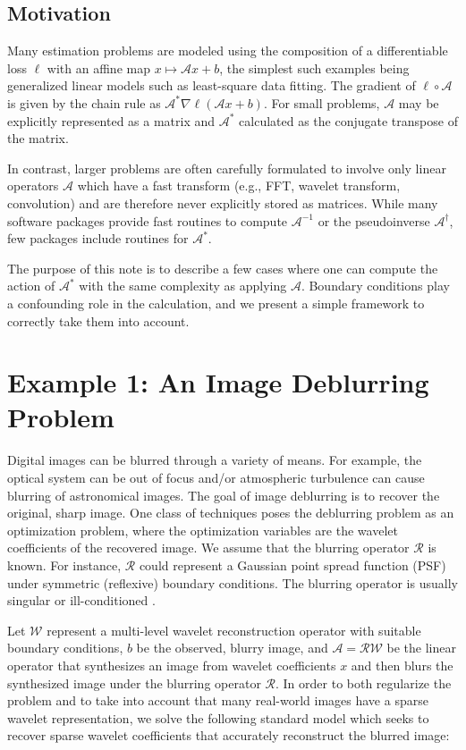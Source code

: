 \documentclass[journal]{IEEEtran}
\newcommand{\A}{\mathcal{A}}
\begin{document}
\subsection*{Motivation}
Many estimation problems are modeled using the composition of a differentiable loss $\ell$ with an affine map $x\mapsto\mathcal{A}x+b$, the simplest such examples being generalized linear models such as least-square data fitting. The gradient of $\ell \circ \A$ is given by the chain rule as $\mathcal{A}^* \nabla \ell( \A x + b)$. For small problems, $\A$ may be explicitly represented as a matrix and $\A^*$ calculated as the conjugate transpose of the matrix. 

In contrast, larger problems are often carefully formulated to involve only linear operators $\A$ which have a fast transform (e.g., FFT, wavelet transform, convolution) and are therefore never explicitly stored as matrices.  While many software packages provide fast routines to compute $\A^{-1}$ or the pseudoinverse $\A^\dagger$, few packages include routines for $\A^*$.

The purpose of this note is to describe a few cases where one can compute the action of $\A^*$ with the same complexity as applying $\A$. Boundary conditions play a confounding role in the calculation, and we present a simple framework to correctly take them into account.


\section{Example 1: An Image Deblurring Problem}
Digital images can be blurred through a variety of means.  For example, the optical system can be out of focus and/or atmospheric turbulence can cause blurring of astronomical images.  The goal of image deblurring is to recover the original, sharp image. One class of techniques poses the deblurring problem  as an optimization problem, where the optimization variables are the wavelet coefficients of the recovered image.  We assume  that the blurring operator $\mathcal{R}$ is known. For instance, $\mathcal{R}$ could represent a Gaussian point spread function (PSF) under symmetric (reflexive) boundary conditions. The blurring operator is usually singular or ill-conditioned \cite{hansen_2006}.

Let $\mathcal{W}$ represent a multi-level wavelet reconstruction operator with suitable boundary conditions, $b$ be the observed, blurry image, and $\mathcal{A}=\mathcal{RW}$ be the linear operator that synthesizes an image from wavelet coefficients $x$ and then blurs the synthesized image under the blurring operator $\mathcal{R}$.  In order to both regularize the problem and to take into account that many real-world images have a sparse wavelet representation, we solve the following standard model which seeks to recover sparse wavelet coefficients that accurately reconstruct the blurred image:
\end{document}
